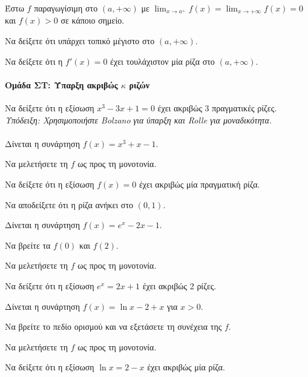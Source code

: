 \documentclass[11pt,a4paper,modern]{FFExercises}
\begin{document}
\askhsh
Έστω $f$ παραγωγίσιμη στο $(a, +\infty)$ με $\displaystyle\lim_{x \to a^+} f(x) = \displaystyle\lim_{x \to +\infty} f(x) = 0$ και $f(x) > 0$ σε κάποιο σημείο.
\begin{alist}
  \item Να δείξετε ότι υπάρχει τοπικό μέγιστο στο $(a, +\infty)$.
  \item Να δείξετε ότι η $f'(x) = 0$ έχει τουλάχιστον μία ρίζα στο $(a, +\infty)$.
\end{alist}


\paragraph{Ομάδα ΣΤ: Ύπαρξη ακριβώς $\kappa$ ριζών}

\askhsh
Να δείξετε ότι η εξίσωση $x^3 - 3x + 1 = 0$ έχει ακριβώς 3 πραγματικές ρίζες.\\
\textit{Υπόδειξη: Χρησιμοποιήστε Bolzano για ύπαρξη και Rolle για μοναδικότητα.}\\\\

\askhsh
Δίνεται η συνάρτηση $f(x) = x^3 + x - 1$.
\begin{alist}
  \item Να μελετήσετε τη $f$ ως προς τη μονοτονία.
  \item Να δείξετε ότι η εξίσωση $f(x) = 0$ έχει ακριβώς μία πραγματική ρίζα.
  \item Να αποδείξετε ότι η ρίζα ανήκει στο $(0, 1)$.
\end{alist}

\askhsh
Δίνεται η συνάρτηση $f(x) = e^x - 2x - 1$.
\begin{alist}
  \item Να βρείτε τα $f(0)$ και $f(2)$.
  \item Να μελετήσετε τη $f$ ως προς τη μονοτονία.
  \item Να δείξετε ότι η εξίσωση $e^x = 2x + 1$ έχει ακριβώς 2 ρίζες.
\end{alist}

\askhsh
Δίνεται η συνάρτηση $f(x) = \ln x - 2 + x$ για $x > 0$.
\begin{alist}
  \item Να βρείτε το πεδίο ορισμού και να εξετάσετε τη συνέχεια της $f$.
  \item Να μελετήσετε τη $f$ ως προς τη μονοτονία.
  \item Να δείξετε ότι η εξίσωση $\ln x = 2 - x$ έχει ακριβώς μία ρίζα.
\end{alist}
\end{document}
